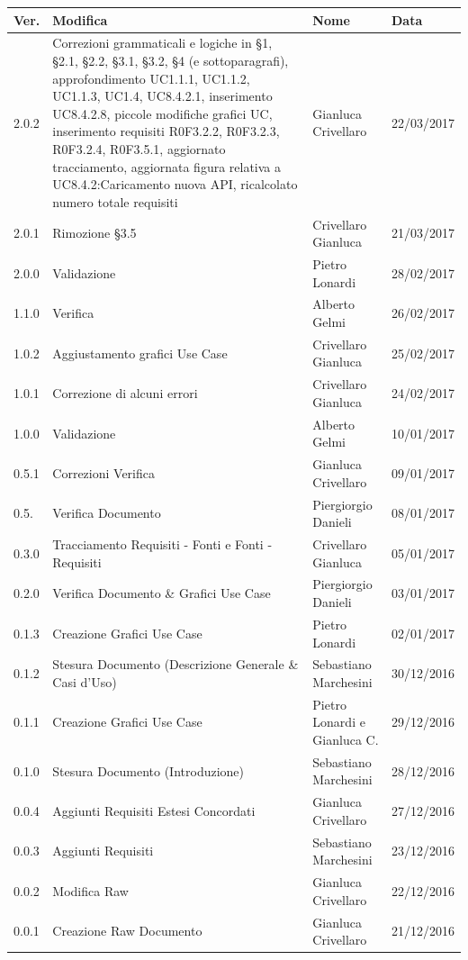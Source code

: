 \documentclass[12pt,a4paper,titlepage]{article}
\begin{document}
		{\renewcommand\arraystretch{1.2}  %
		\begin{tabular}{|m{3em}|m{27em}|m{10em}|m{5em}|}
			\hline
			{\textbf{Ver.}}&{\textbf{Modifica}}&{\textbf{Nome}}&{\textbf{Data}}\\
			\hline 
			2.0.2 & Correzioni grammaticali e logiche in §1, §2.1, §2.2, §3.1, §3.2, §4 (e sottoparagrafi), approfondimento UC1.1.1, UC1.1.2, UC1.1.3, UC1.4, UC8.4.2.1, inserimento UC8.4.2.8, piccole modifiche grafici UC, inserimento requisiti R0F3.2.2, R0F3.2.3, R0F3.2.4, R0F3.5.1, aggiornato tracciamento, aggiornata figura relativa a UC8.4.2:Caricamento nuova API, ricalcolato numero totale requisiti & Gianluca Crivellaro & 22/03/2017\\
			\hline 
			2.0.1 & Rimozione §3.5 & Crivellaro Gianluca & 21/03/2017\\
			\hline
			2.0.0 & Validazione & Pietro Lonardi & 28/02/2017\\
			\hline
			1.1.0 & Verifica &  Alberto Gelmi & 26/02/2017 \\
			\hline
			1.0.2 & Aggiustamento grafici Use Case & Crivellaro Gianluca & 25/02/2017 \\
			\hline
			1.0.1 &	Correzione di alcuni errori & Crivellaro Gianluca & 24/02/2017 \\
			\hline
			1.0.0 & Validazione & Alberto Gelmi & 10/01/2017\\
			\hline
			0.5.1 & Correzioni Verifica & Gianluca Crivellaro & 09/01/2017  \\
			\hline
			0.5. & Verifica Documento & Piergiorgio Danieli & 08/01/2017 \\
			\hline
			0.3.0 & Tracciamento Requisiti - Fonti e Fonti -Requisiti & Crivellaro Gianluca & 05/01/2017 \\
			\hline
			0.2.0 & Verifica Documento \& Grafici Use Case & Piergiorgio Danieli & 03/01/2017 \\
			\hline
			0.1.3 & Creazione Grafici Use Case & Pietro Lonardi & 02/01/2017 \\
			\hline
			0.1.2 & Stesura Documento (Descrizione Generale \& Casi d'Uso) & Sebastiano Marchesini & 30/12/2016  \\	
			\hline
			0.1.1 & Creazione Grafici Use Case & Pietro Lonardi e Gianluca C. & 29/12/2016  \\
			\hline
			0.1.0 & Stesura Documento (Introduzione) & Sebastiano Marchesini &  28/12/2016  \\
			\hline
			0.0.4 & Aggiunti Requisiti Estesi Concordati & Gianluca Crivellaro & 27/12/2016  \\
			\hline
			0.0.3 & Aggiunti Requisiti & Sebastiano Marchesini & 23/12/2016  \\
			\hline
			0.0.2 & Modifica Raw & Gianluca Crivellaro & 22/12/2016  \\
			\hline
			0.0.1 & Creazione Raw Documento & Gianluca Crivellaro & 21/12/2016  \\
			\hline
		\end{tabular}
	}	\normalsize
	\newpage
	\tableofcontents
	\thispagestyle{empty}
	
\end{document}

